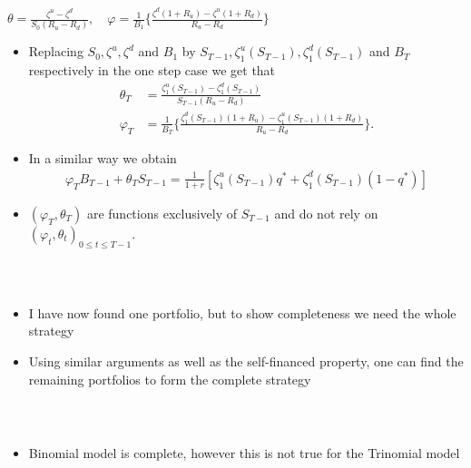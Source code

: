 \documentclass{beamer}
\numberwithin{equation}{section}
\begin{document}
\begin{frame}\frametitle{{\normalsize \secname} \\ {\large \subsecname}}
    \begin{center}
    $\theta = \frac{\zeta^u - \zeta^d}{S_0 (R_u - R_d)}, \quad \varphi = \frac{1}{B_1} \bigg\{ \frac{\zeta^d(1+R_u) - \zeta^u(1+R_d)}{R_u - R_d} \bigg\}$
    \end{center}
    \begin{itemize}
        \item Replacing $S_0, \zeta^u, \zeta^d$ and $B_1$ by $S_{T-1}, \zeta_1^u(S_{T-1}), \zeta_1^d(S_{T-1})$ and $B_T$ respectively in the one step case we get that 
        \begin{align*}
            \theta_T&= \frac{\zeta^u_1 (S_{T-1}) - \zeta_1^d (S_{T-1})}{S_{T-1}(R_u - R_d)}\\
            \varphi_T &= \frac{1}{B_T} \Bigg\{  \frac{\zeta_1^d (S_{T-1})  (1+R_u) - \zeta_1^u (S_{T-1}) (1+R_d)}{R_u - R_d} \Bigg\}. 
        \end{align*}
                \item In a similar way we obtain 
        \begin{align*}
            \varphi_T B_{T-1} + \theta_T S_{T-1} = \frac{1}{1+r} \left[ \zeta_1^u(S_{T-1})q^* + \zeta_1^d(S_{T-1})(1 - q^*) \right]
        \end{align*}
        \item $(\varphi_T, \theta_T)$ are functions exclusively of $S_{T-1}$ and do not rely on $(\varphi_t, \theta_t)_{0 \leq t \leq T-1}$.
    \end{itemize}
\end{frame}

\begin{frame}\frametitle{{\normalsize \secname} \\ {\large \subsecname}}
    \begin{itemize}
        \item I have now found one portfolio, but to show completeness we need the whole strategy
        \item Using similar arguments as well as the self-financed property, one can find the remaining portfolios to form the complete strategy
    \end{itemize}
\end{frame}

\begin{frame}\frametitle{{\normalsize \secname} \\ {\large \subsecname}}
    \begin{itemize}
        \item Binomial model is complete, however this is not true for the Trinomial model
        \vspace{6cm}
    \end{itemize}
\end{frame}
\end{document}
